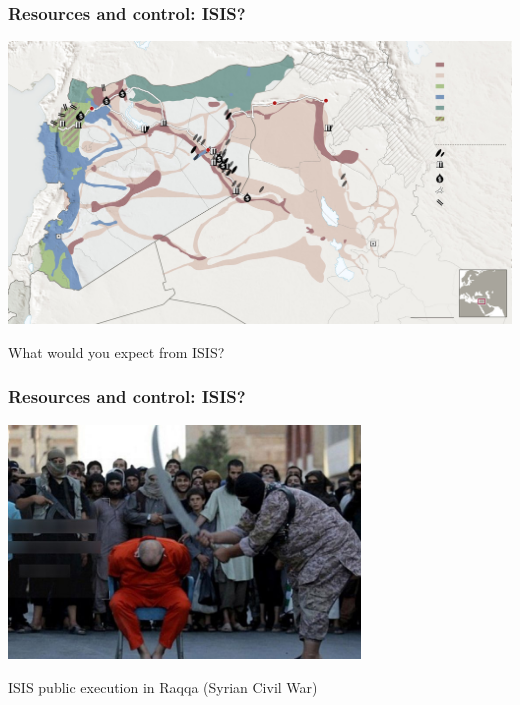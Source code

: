 \documentclass[utf8, xcolor=dvipsnames]{beamer}
\begin{document}
\begin{frame}
\frametitle{Resources and control: ISIS?}
\centering

\includegraphics[width = \textwidth]{img/isis_syria_oil}

What would you expect from ISIS?

\end{frame}

\begin{frame}
\frametitle{Resources and control: ISIS?}
\centering

\includegraphics[width = 0.7\textwidth]{img/isis-raqqa}

\vspace{15pt}

ISIS public execution in Raqqa (Syrian Civil War)

\end{frame}
\end{document}
